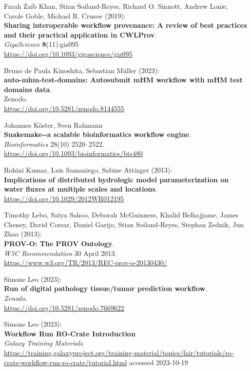 \documentclass[10pt,letterpaper]{article}
\begin{document}
\begin{thebibliography}{10}
\begin{small}
 Farah Zaib Khan, Stian Soiland-Reyes, Richard O.
Sinnott, Andrew Lonie, Carole Goble, Michael R. Crusoe (2019):\\
\textbf{Sharing interoperable workflow provenance: A review of best
practices and their practical application in CWLProv}.\\
\emph{GigaScience} \textbf{8}(11):giz095\\
\url{https://doi.org/10.1093/gigascience/giz095}

 Bruno de Paula Kinoshita, Sebastian Müller
(2023):\\
\textbf{auto-mhm-test-domains: Autosubmit mHM workflow with mHM test
domains data}.\\
Zenodo.\\
\url{https://doi.org/10.5281/zenodo.8144555}

Johannes Köster, Sven Rahmann \\
\textbf{Snakemake-\/-a scalable bioinformatics workflow engine}.\\
\emph{Bioinformatics} 28(10) 2520--2522.\\
\url{https://doi.org/10.1093/bioinformatics/bts480}

 Rohini Kumar, Luis Samaniego, Sabine Attinger (2013):\\
\textbf{Implications of distributed hydrologic model parameterization on
water fluxes at multiple scales and locations}.\\
\url{https://doi.org/10.1029/2012WR012195}

 Timothy Lebo, Satya Sahoo, Deborah McGuinness, Khalid
Belhajjame, James Cheney, David Corsar, Daniel Garijo, Stian
Soiland-Reyes, Stephan Zednik, Jun Zhao (2013):\\
\textbf{PROV-O: The PROV Ontology}.\\
\emph{W3C Recommendation} 30 April 2013.\\
\url{https://www.w3.org/TR/2013/REC-prov-o-20130430/}

 Simone Leo (2023):\\
\textbf{Run of digital pathology tissue/tumor prediction workflow}.\\
\emph{Zenodo}.\\
\url{https://doi.org/10.5281/zenodo.7669622}

Simone Leo (2023):\\
\textbf{Workflow Run RO-Crate Introduction} \\
\emph{Galaxy Training Materials}.\\
\url{https://training.galaxyproject.org/training-material/topics/fair/tutorials/ro-crate-workflow-run-ro-crate/tutorial.html} accessed 2023-10-19


\end{small}
\end{thebibliography}
\end{document}
